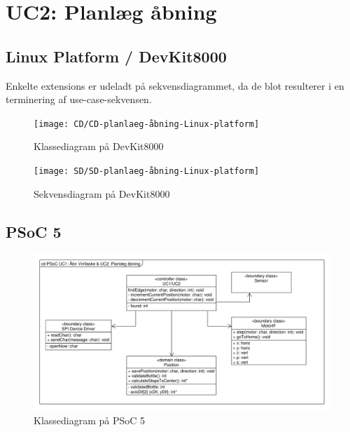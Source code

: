\section{UC2: Planlæg åbning}

\subsection{Linux Platform / DevKit8000}

Enkelte extensions er udeladt på sekvensdiagrammet, da de blot resulterer i en terminering af use-case-sekvensen.

\begin{figure}[H]
	\caption{Klassediagram  på DevKit8000}
	\label{CD:UC2-devkit}
	\texttt{[image: CD/CD-planlaeg-åbning-Linux-platform]}
\end{figure}

\begin{figure}[H]
	\caption{Sekvensdiagram  på DevKit8000}
	\label{SD:UC2-devkit}
	\texttt{[image: SD/SD-planlaeg-åbning-Linux-platform]}
\end{figure}

\subsection{PSoC 5}
\begin{figure}[H]
	\caption{Klassediagram  på PSoC 5}
	\label{CD:PSoC:UC2-1}
	\includegraphics[scale=0.38,trim=0 0 0 0, clip]{CD/UC1_og_UC2_CD}
\end{figure}

